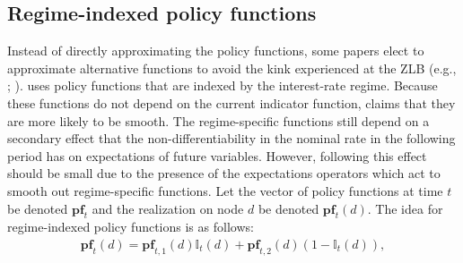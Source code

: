 \documentclass[12pt, final]{article}
\begin{document}
\subsection{Regime-indexed policy functions} Instead of directly approximating the policy functions, some papers elect to approximate alternative functions to avoid the kink experienced at the ZLB (e.g., \hyperlink{Gust}{\color{black}{Gust et al.,\ 2017}}; \hyperlink{Aruoba}{\color{black}{Aruoba et al.,\ 2018}}). \hyperlink{Gust}{\color{black}{Gust et al.\ (2017)}} uses policy functions that are indexed by the interest-rate regime. Because these functions do not depend on the current indicator function, \hyperlink{Gust}{\color{black}{Gust et al.\ (2017)}} claims that they are more likely to be smooth. The regime-specific functions still depend on a secondary effect that the non-differentiability in the nominal rate in the following period has on expectations of future variables.  However, following \hyperlink{Christiano}{\color{black}{Christiano and Fisher (2000)}} this effect should be small due to the presence of the expectations operators which act to smooth out regime-specific functions. Let the vector of policy functions at time $t$ be denoted $\textbf{pf}_t$ and the realization on node $d$ be denoted $\textbf{pf}_t(d)$. The idea for regime-indexed policy functions is as follows:
\begin{gather}
    \label{eq:18}
  \textbf{pf}_t(d) = \textbf{pf}_{t,1}(d)\mathds{I}_t(d) + \textbf{pf}_{t,2}(d)(1-\mathds{I}_t(d)),
\end{gather}
\end{document}
